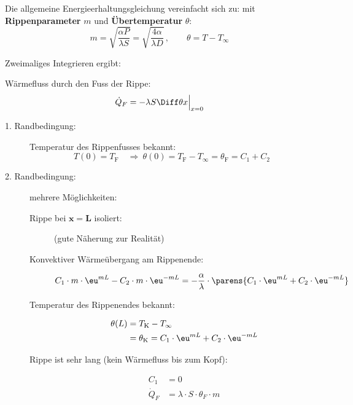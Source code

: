 			Die allgemeine Energieerhaltungsgleichung vereinfacht sich zu:
			mit \textbf{Rippenparameter} $m$ und \textbf{Übertemperatur} $\theta$:
			\[
				m = \sqrt{
					\frac{\alpha P}{\lambda S}
				} = \sqrt{
					\frac{4 \alpha}{\lambda D}
				}
				\,,\qquad
				\theta = T - T_\infty
			\]

			Zweimaliges Integrieren ergibt:

			Wärmefluss durch den Fuss der Rippe:
			\[
				\dot Q_F = - \lambda S \Diff \theta x \Big|_{x = 0}
			\]

			\begin{description}
				\item[1. Randbedingung:] Temperatur des Rippenfusses bekannt:
					\[
						T(0) = T_\text{F} \quad \Rightarrow \ \theta(0) = T_\text{F} - T_\infty = \theta_\text{F} = C_1 + C_2
					\]
				\item[2. Randbedingung:] mehrere Möglichkeiten:
					\begin{description}
						\item[Rippe bei $\boldsymbol{x = L}$ isoliert:] (gute Näherung zur Realität)
						\item[Konvektiver Wärmeübergang am Rippenende:]
							\[
								C_1 \cdot m \cdot \eu^{mL} - C_2 \cdot m \cdot \eu^{-mL} = - \frac{\alpha}{\lambda} \cdot \parens{C_1 \cdot \eu^{mL} + C_2 \cdot \eu^{-mL}}
							\]
						\item[Temperatur des Rippenendes bekannt:]
							\begin{align*}
								\theta(L) &= T_\text{K} - T_\infty \\
								&= \theta_\text{K} = C_1 \cdot \eu^{mL} + C_2 \cdot \eu^{-mL}
							\end{align*}
						\item[Rippe ist sehr lang (kein Wärmefluss bis zum Kopf):]
							\begin{align*}
								C_1 &= 0 \\
								\dot Q_F &= \lambda \cdot S \cdot \theta_F \cdot m
							\end{align*}
					\end{description}
			\end{description}

